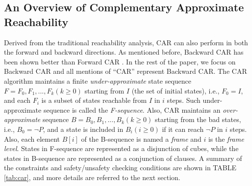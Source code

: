 \iffalse
In the CAR algorithm, A is usually an explicit state and B is $T \bigwedge B_{i}$, where $T$ is the transition system of $Sys=(V,I,T)$ and $B_{i}$ is the \textit{i}-th level of B-sequence(will describe in below).

A SAT call like $\mathit{SAT}(A,B)$ will have two possible outcomes: 

1.satisfied, we will then use \textbf{get\_assignment()} to get a satisfying assignment to literals in A and B. 

2.unsatisfied, we will then use \textbf{get\_unsat\_core()} to get an unsatisfiable core c that $ c \subseteq A $ and $ c \bigwedge T $ is unsatisfiable.


In mathematical logic, given an unsatisfiable Boolean propositional formula in conjunctive normal form, like $\mathit{SAT}(A,B)$, if the outcome is unsatisfied, a subset of clauses whose conjunction is still unsatisfiable is called an unsatisfiable core of the original formula. In the CAR algorithm, the unsatisfiable core comes from the assumption which means it only contains some of the literals from the assumption. For example, given an unsatisfied SAT call $\mathit{SAT}(A,B)$, where A is a conjunction of literals $A=l_{1}\cap l_{2}\cap l_{3}\cap ...\cap l_{n}$ and B is a conjunction of clause $B=c_{1}\cap c_{2}\cap...\cap c_{m}$. The obtained unsatisfiable core will be $u_{1}\cap u_{2}\cap...\cap u_{j} \quad u_{i}\in A \,(1\leq i\leq j)$.
\fi

\subsection{An Overview of Complementary Approximate Reachability}

Derived from the traditional reachability analysis, CAR can also perform in both the forward and backward directions. 
As mentioned before, Backward CAR has been shown better than Forward CAR \cite{LDPRV18}. In the rest of the paper, we focus on Backward CAR and all mentions of ``CAR'' represent Backward CAR. 
The CAR algorithm maintains a finite \emph{under-approximate} state sequence $F=F_{0},F_{1},...,F_{k} (k\geq 0)$  starting from $I$  (the set of initial states), i.e., $F_{0}=I$,  and each $F_{i}$ is a  subset of states reachable from $I$ in $i$ steps. Such under-approximate sequence is called the \emph{F-sequence}. Also, CAR maintains an \emph{over-approximate} sequence $B = B_{0},B_{1},...,B_{k} (k\geq 0)$ starting from the bad states, i.e., $B_{0}=\neg P$, and a state is included in $B_{i} (i\geq 0)$ if it can reach $\neg P$ in $i$ steps. Also, each element $B[i]$ of the B-sequence is named a \emph{frame} and $i$ is the \emph{frame level}. States in F-sequence are represented as a disjunction of cubes, while the states in B-sequence are represented as a conjunction of clauses. A summary of the constraints and safety/unsafety checking conditions are shown in TABLE \ref{tab:car}, and more details are referred to the next section.

